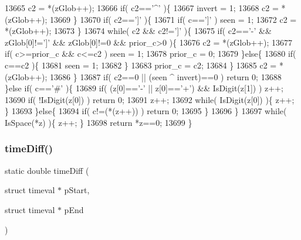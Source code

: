 \begin{DoxyCode}
13665       c2 = *(zGlob++);
13666       \textcolor{keywordflow}{if}( c2==\textcolor{charliteral}{'^'} )\{
13667         invert = 1;
13668         c2 = *(zGlob++);
13669       \}
13670       \textcolor{keywordflow}{if}( c2==\textcolor{charliteral}{']'} )\{
13671         \textcolor{keywordflow}{if}( c==\textcolor{charliteral}{']'} ) seen = 1;
13672         c2 = *(zGlob++);
13673       \}
13674       \textcolor{keywordflow}{while}( c2 && c2!=\textcolor{charliteral}{']'} )\{
13675         \textcolor{keywordflow}{if}( c2==\textcolor{charliteral}{'-'} && zGlob[0]!=\textcolor{charliteral}{']'} && zGlob[0]!=0 && prior\_c>0 )\{
13676           c2 = *(zGlob++);
13677           \textcolor{keywordflow}{if}( c>=prior\_c && c<=c2 ) seen = 1;
13678           prior\_c = 0;
13679         \}\textcolor{keywordflow}{else}\{
13680           \textcolor{keywordflow}{if}( c==c2 )\{
13681             seen = 1;
13682           \}
13683           prior\_c = c2;
13684         \}
13685         c2 = *(zGlob++);
13686       \}
13687       \textcolor{keywordflow}{if}( c2==0 || (seen ^ invert)==0 ) \textcolor{keywordflow}{return} 0;
13688     \}\textcolor{keywordflow}{else} \textcolor{keywordflow}{if}( c==\textcolor{charliteral}{'#'} )\{
13689       \textcolor{keywordflow}{if}( (z[0]==\textcolor{charliteral}{'-'} || z[0]==\textcolor{charliteral}{'+'}) && IsDigit(z[1]) ) z++;
13690       \textcolor{keywordflow}{if}( !IsDigit(z[0]) ) \textcolor{keywordflow}{return} 0;
13691       z++;
13692       \textcolor{keywordflow}{while}( IsDigit(z[0]) )\{ z++; \}
13693     \}\textcolor{keywordflow}{else}\{
13694       \textcolor{keywordflow}{if}( c!=(*(z++)) ) \textcolor{keywordflow}{return} 0;
13695     \}
13696   \}
13697   \textcolor{keywordflow}{while}( IsSpace(*z) )\{ z++; \}
13698   \textcolor{keywordflow}{return} *z==0;
13699 \}
\end{DoxyCode}
\mbox{\label{shell_8c_ab8148977e2401f39f00969bfce1fc1a3}} 
\subsubsection{time\+Diff()}
{\footnotesize\ttfamily static double time\+Diff (\begin{DoxyParamCaption}\item[{struct timeval $\ast$}]{p\+Start,  }\item[{struct timeval $\ast$}]{p\+End }\end{DoxyParamCaption})\hspace{0.3cm}{\ttfamily [static]}}



